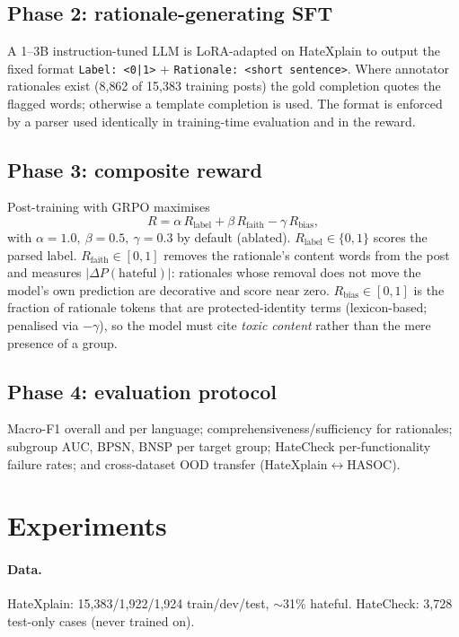 \documentclass[11pt]{article}
\begin{document}
\subsection{Phase 2: rationale-generating SFT}
A 1--3B instruction-tuned LLM is LoRA-adapted \citep{hu2022lora} on
HateXplain to output the fixed format
\texttt{Label: <0|1>} + \texttt{Rationale: <short sentence>}. Where
annotator rationales exist (8{,}862 of 15{,}383 training posts) the gold
completion quotes the flagged words; otherwise a template completion is
used. The format is enforced by a parser used identically in training-time
evaluation and in the reward.

\subsection{Phase 3: composite reward}
\label{sec:reward}
Post-training with GRPO maximises
\begin{equation}
R = \alpha\,R_{\text{label}} + \beta\,R_{\text{faith}} - \gamma\,R_{\text{bias}},
\end{equation}
with $\alpha{=}1.0,\ \beta{=}0.5,\ \gamma{=}0.3$ by default (ablated).
$R_{\text{label}} \in \{0,1\}$ scores the parsed label.
$R_{\text{faith}} \in [0,1]$ removes the rationale's content words from the
post and measures $|\Delta P(\text{hateful})|$: rationales whose removal
does not move the model's own prediction are decorative and score near
zero. $R_{\text{bias}} \in [0,1]$ is the fraction of rationale tokens that
are protected-identity terms (lexicon-based; penalised via $-\gamma$), so
the model must cite \emph{toxic content} rather than the mere presence of a
group.

\subsection{Phase 4: evaluation protocol}
\label{sec:eval}
Macro-F1 overall and per language; comprehensiveness/sufficiency for
rationales; subgroup AUC, BPSN, BNSP per target group; HateCheck
per-functionality failure rates; and cross-dataset OOD transfer
(HateXplain$\leftrightarrow$HASOC).

\section{Experiments}
\paragraph{Data.} HateXplain: 15{,}383/1{,}922/1{,}924 train/dev/test,
$\sim$31\% hateful. HateCheck: 3{,}728 test-only cases (never trained on).
\end{document}
